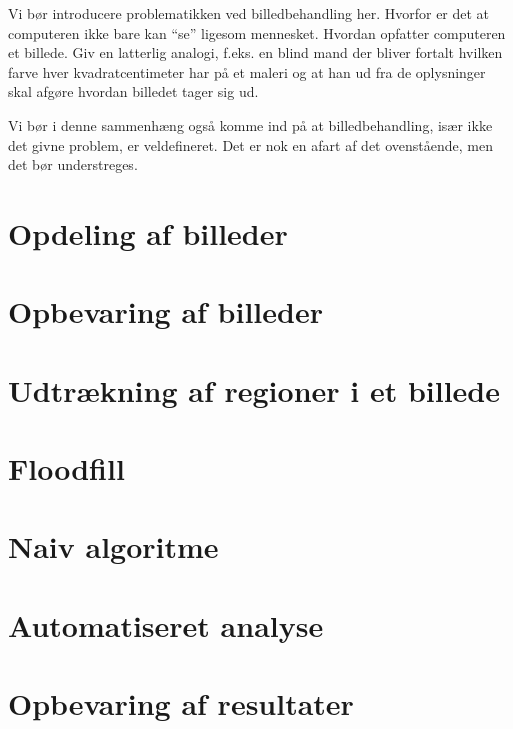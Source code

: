 {
{\sffamily Vi bør introducere problematikken ved billedbehandling her.
Hvorfor er det at computeren ikke bare kan ``se'' ligesom mennesket.
Hvordan opfatter computeren et billede. Giv en latterlig analogi, f.eks.
en blind mand der bliver fortalt hvilken farve hver kvadratcentimeter
har på et maleri og at han ud fra de oplysninger skal afgøre hvordan
billedet tager sig ud.

Vi bør i denne sammenhæng også komme ind på at billedbehandling, især
ikke det givne problem, er veldefineret. Det er nok en afart af det
ovenstående, men det bør understreges.
}

\section{Opdeling af billeder}


\section{Opbevaring af billeder\label{section_opbv_billeder}}


\section{Udtrækning af regioner i et billede}


\section{Floodfill}


\section{Naiv algoritme\label{naiv_algoritme}}


\section{Automatiseret analyse}


\section{Opbevaring af resultater\label{section_results}}


}


